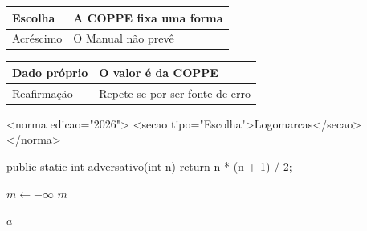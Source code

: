 \documentclass[dsc,pdfa,coorientador,numbers,twoside,orientadorexamina]{coppe}
\begin{document}
  \begin{quadro}[ht]
    \centering\caption{Segundo quadro}\label{qua:adv2}
    \begin{tabular}{|l|l|}\hline Escolha & A COPPE fixa uma forma\\ \hline
      Acréscimo & O Manual não prevê\\ \hline\end{tabular}
  \end{quadro}
  \begin{quadro}[ht]
    \centering\caption{Terceiro quadro}\label{qua:adv3}
    \begin{tabular}{|l|l|}\hline Dado próprio & O valor é da COPPE\\ \hline
      Reafirmação & Repete-se por ser fonte de erro\\ \hline\end{tabular}
  \end{quadro}
  \begin{xml}[caption={Segundo programa, em XML},label=prog:adv2]
<norma edicao="2026">
  <secao tipo="Escolha">Logomarcas</secao>
</norma>
  \end{xml}
  \begin{java}[caption={Terceiro programa, em Java},label=prog:adv3]
public static int adversativo(int n) {
    return n * (n + 1) / 2;
}
  \end{java}
  \begin{algorithm}[H]
    \caption{Segundo algoritmo}\label{alg:adv2}
    $m \leftarrow -\infty$\;
    \Return $m$\;
  \end{algorithm}
  \begin{algorithm}[H]
    \caption{Terceiro algoritmo}\label{alg:adv3}
    \Return $a$\;
  \end{algorithm}
\end{document}
